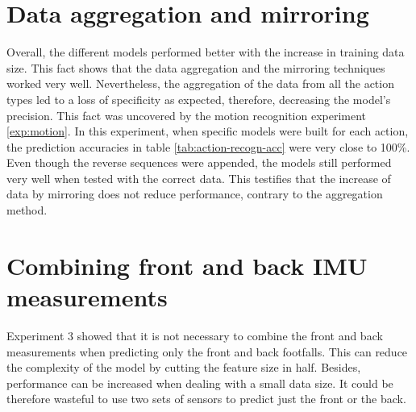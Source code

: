 \section{Data aggregation and mirroring}
Overall, the different models performed better with the increase in training data size. This fact shows that the data aggregation and the mirroring techniques worked very well. Nevertheless, the aggregation of the data from all the action types led to a loss of specificity as expected, therefore, decreasing the model's precision. This fact was uncovered by the motion recognition experiment \ref{exp:motion}. In this experiment, when specific models were built for each action, the prediction accuracies in table \ref{tab:action-recogn-acc} were very close to 100\%.\\
Even though the reverse sequences were appended, the models still performed very well when tested with the correct data. This testifies that the increase of data by mirroring does not reduce performance, contrary to the aggregation method.

\section{Combining front and back IMU measurements}
Experiment 3 showed that it is not necessary to combine the front and back measurements when predicting only the front and back footfalls.
This can reduce the complexity of the model by cutting the feature size in half. Besides, performance can be increased when dealing with a small data size.
It could be therefore wasteful to use two sets of sensors to predict just the front or the back.